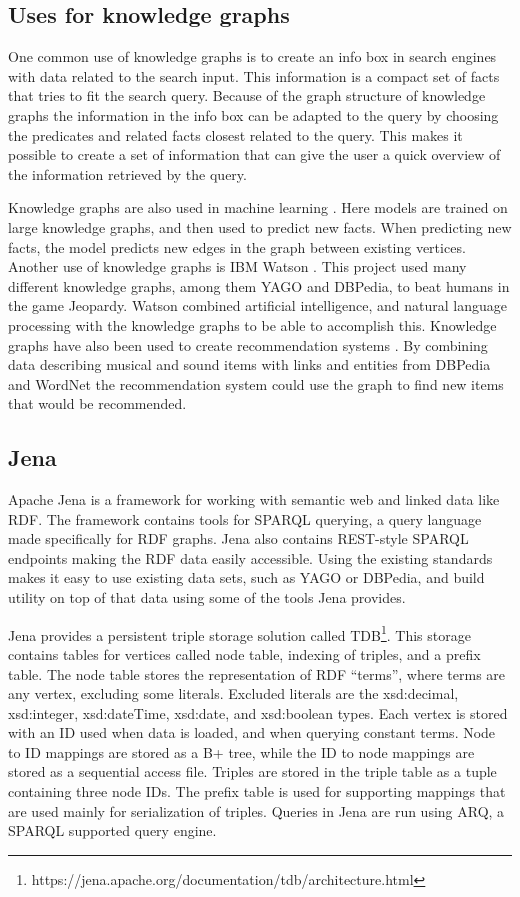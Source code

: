 \subsection{Uses for knowledge graphs}
One common use of knowledge graphs is to create an info box in search engines with data related to the search input. This information is a compact set of facts that tries to fit the search query. Because of the graph structure of knowledge graphs the information in the info box can be adapted to the query by choosing the predicates and related facts closest related to the query. This makes it possible to create a set of information that can give the user a quick overview of the information retrieved by the query.

Knowledge graphs are also used in machine learning \cite{nickel2015review}. Here models are trained on large knowledge graphs, and then used to predict new facts. When predicting new facts, the model predicts new edges in the graph between existing vertices. Another use of knowledge graphs is IBM Watson \cite{ferrucci2010building}. This project used many different knowledge graphs, among them YAGO and DBPedia, to beat humans in the game Jeopardy. Watson combined artificial intelligence, and natural language processing with the knowledge graphs to be able to accomplish this. Knowledge graphs have also been used to create recommendation systems \cite{oramas2016sound}. By combining data describing musical and sound items with links and entities from DBPedia and WordNet the recommendation system could use the graph to find new items that would be recommended. 

\subsection{Jena}
Apache Jena is a framework for working with semantic web and linked data like RDF. The framework contains tools for SPARQL querying, a query language made specifically for RDF graphs. Jena also contains REST-style SPARQL endpoints making the RDF data easily accessible. Using the existing standards makes it easy to use existing data sets, such as YAGO or DBPedia, and build utility on top of that data using some of the tools Jena provides.

Jena provides a persistent triple storage solution called TDB\footnote{https://jena.apache.org/documentation/tdb/architecture.html}. This storage contains tables for vertices called node table, indexing of triples, and a prefix table. The node table stores the representation of RDF ``terms'', where terms are any vertex, excluding some literals. Excluded literals are the xsd:decimal, xsd:integer, xsd:dateTime, xsd:date, and xsd:boolean types. Each vertex is stored with an ID used when data is loaded, and when querying constant terms. Node to ID mappings are stored as a B+ tree, while the ID to node mappings are stored as a sequential access file. Triples are stored in the triple table as a tuple containing three node IDs. The prefix table is used for supporting mappings that are used mainly for serialization of triples. Queries in Jena are run using ARQ, a SPARQL supported query engine.

\glsresetall